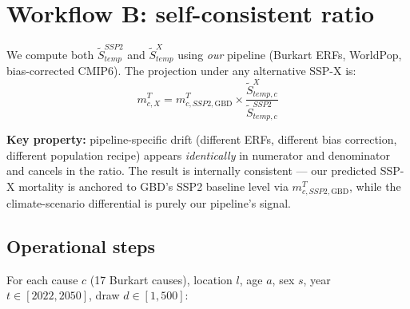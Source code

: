 \documentclass[11pt]{article}
\begin{document}
\section{Workflow B: self-consistent ratio}

We compute both $\tilde{S}^{SSP2}_{temp}$ and $\tilde{S}^X_{temp}$ using \emph{our} pipeline (Burkart ERFs, WorldPop, bias-corrected CMIP6). The projection under any alternative SSP-X is:
\begin{equation}
\boxed{m^T_{c,X} = m^T_{c,SSP2,\text{GBD}} \times \frac{\tilde{S}^X_{temp,c}}{\tilde{S}^{SSP2}_{temp,c}}}
\end{equation}

\textbf{Key property:} pipeline-specific drift (different ERFs, different bias correction, different population recipe) appears \emph{identically} in numerator and denominator and cancels in the ratio. The result is internally consistent --- our predicted SSP-X mortality is anchored to GBD's SSP2 baseline level via $m^T_{c,SSP2,\text{GBD}}$, while the climate-scenario differential is purely our pipeline's signal.

\subsection{Operational steps}

For each cause $c$ (17 Burkart causes), location $l$, age $a$, sex $s$, year $t \in [2022, 2050]$, draw $d \in [1, 500]$:
\end{document}
